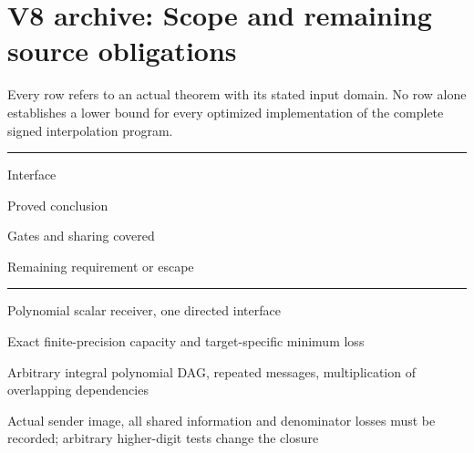 \documentclass[11pt,a4paper]{article}
\newlength{\OfflineResearchTableWidth}
\newcommand{\OfflineResearchHeaderRule}{\noindent\rule{\linewidth}{0.45pt}\par}
\newcommand{\OfflineResearchRow}{\par}
\newenvironment{OfflineResearchTable}{%
  \par\medskip\begingroup\small\setlength{\parindent}{0pt}%
  \setlength{\parskip}{3pt plus 1pt minus .5pt}%
  \setlength{\OfflineResearchTableWidth}{\linewidth}%
}{%
  \par\endgroup\medskip%
}
\begin{document}
\section{V8 archive: Scope and remaining source obligations}\label{v8-section-coverage}

Every row refers to an actual theorem with its stated input domain. No
row alone establishes a lower bound for every optimized implementation
of the complete signed interpolation program.

\begin{OfflineResearchTable}
\OfflineResearchHeaderRule
\noindent%
\begin{minipage}[t]{0.17955\OfflineResearchTableWidth}\raggedright
Interface
\end{minipage}\hfill%
\begin{minipage}[t]{0.22680\OfflineResearchTableWidth}\raggedright
Proved conclusion
\end{minipage}\hfill%
\begin{minipage}[t]{0.23625\OfflineResearchTableWidth}\raggedright
Gates and sharing covered
\end{minipage}\hfill%
\begin{minipage}[t]{0.30240\OfflineResearchTableWidth}\raggedright
Remaining requirement or escape
\end{minipage}%
\OfflineResearchRow
\nobreak
\OfflineResearchHeaderRule
\nobreak
\noindent%
\begin{minipage}[t]{0.17955\OfflineResearchTableWidth}\raggedright
Polynomial scalar receiver, one directed interface
\end{minipage}\hfill%
\begin{minipage}[t]{0.22680\OfflineResearchTableWidth}\raggedright
Exact
finite-precision capacity and target-specific minimum loss
\end{minipage}\hfill%
\begin{minipage}[t]{0.23625\OfflineResearchTableWidth}\raggedright
Arbitrary
integral polynomial DAG, repeated messages, multiplication of
overlapping dependencies
\end{minipage}\hfill%
\begin{minipage}[t]{0.30240\OfflineResearchTableWidth}\raggedright
Actual sender image, all shared information
and denominator losses must be recorded; arbitrary higher-digit tests
change the closure
\end{minipage}%
\OfflineResearchRow
\noindent%
\begin{minipage}[t]{0.17955\OfflineResearchTableWidth}\raggedright

\end{minipage}
\end{OfflineResearchTable}
\end{document}
